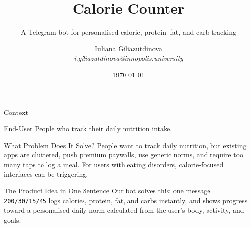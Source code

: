 \documentclass[aspectratio=169]{beamer}
\title{\textbf{Calorie Counter}}
\subtitle{A Telegram bot for personalised calorie, protein, fat, and carb tracking}
\author{Iuliana Giliazutdinova \\ \textit{\small i.giliazutdinova@innopolis.university}}
\institute{Innopolis University \\ Group B25-DSAI-02}
\date{\today}
\begin{document}
\begin{frame}[plain]
    \titlepage
\end{frame}

\begin{frame}{Context}
    \vspace{0.3cm}
    
    \begin{block}{\faUser{} End-User}
        People who track their daily nutrition intake.
    \end{block}

    \vspace{0.3cm}
    
    \begin{block}{\faExclamationTriangle{} What Problem Does It Solve?}
        People want to track daily nutrition, but existing apps are cluttered, push premium paywalls, use generic norms, and require too many taps to log a meal. For users with eating disorders, calorie-focused interfaces can be triggering.
    \end{block}

    \vspace{0.3cm}
    
    \begin{alertblock}{\faLightbulb{} The Product Idea in One Sentence}
        Our bot solves this: one message \texttt{200/30/15/45} logs calories, protein, fat, and carbs instantly, and shows progress toward a personalised daily norm calculated from the user's body, activity, and goals.
    \end{alertblock}
\end{frame}
\end{document}
